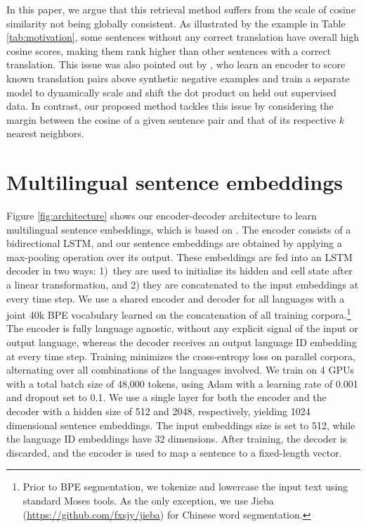 \documentclass[11pt,a4paper]{article}
\begin{document}
\InsertExample

In this paper, we argue that this retrieval method suffers from the scale of cosine similarity not being globally consistent. As illustrated by the example in Table \ref{tab:motivation}, some sentences without any correct translation have overall high cosine scores, making them rank higher than other sentences with a correct translation. This issue was also pointed out by \citet{guo:2018:wmt_effective}, who learn an encoder to score known translation pairs above synthetic negative examples and train a separate model to dynamically scale and shift the dot product on held out supervised data. In contrast, our proposed method tackles this issue by considering the margin between the cosine of a given sentence pair and that of its respective $k$ nearest neighbors.











\section{Multilingual sentence embeddings}
\label{sec:embeddings}


Figure \ref{fig:architecture} shows our encoder-decoder architecture to learn multilingual sentence embeddings, which is based on \citet{schwenk2018filtering}. The encoder consists of a bidirectional LSTM, and our sentence embeddings are obtained by applying a max-pooling operation over its output. These embeddings are fed into an LSTM decoder in two ways: 1)~they are used to initialize its hidden and cell state after a linear transformation, and 2) they are concatenated to the input embeddings at every time step. We use a shared encoder and decoder for all languages with a joint 40k BPE vocabulary learned on the concatenation of all training corpora.\footnote{Prior to BPE segmentation, we tokenize and lowercase the input text using standard Moses tools. As the only exception, we use Jieba (\url{https://github.com/fxsjy/jieba}) for Chinese word segmentation.} The encoder is fully language agnostic, without any explicit signal of the input or output language, whereas the decoder receives an output language ID embedding at every time step. Training minimizes the cross-entropy loss on parallel corpora, alternating over all combinations of the languages involved. We train on 4 GPUs with a total batch size of 48,000 tokens, using Adam with a learning rate of 0.001 and dropout set to 0.1. We use a single layer for both the encoder and the decoder with a hidden size of 512 and 2048, respectively, yielding 1024 dimensional sentence embeddings. The input embeddings size is set to 512, while the language ID embeddings have 32 dimensions. After training, the decoder is discarded, and the encoder is used to map a sentence to a fixed-length vector.
\end{document}
